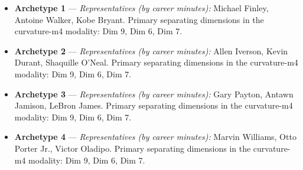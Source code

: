 \begin{itemize}
\item \textbf{Archetype 1} --- \emph{Representatives (by career minutes):} Michael Finley, Antoine Walker, Kobe Bryant. Primary separating dimensions in the curvature-m4 modality: Dim 9, Dim 6, Dim 7.
\item \textbf{Archetype 2} --- \emph{Representatives (by career minutes):} Allen Iverson, Kevin Durant, Shaquille O'Neal. Primary separating dimensions in the curvature-m4 modality: Dim 9, Dim 6, Dim 7.
\item \textbf{Archetype 3} --- \emph{Representatives (by career minutes):} Gary Payton, Antawn Jamison, LeBron James. Primary separating dimensions in the curvature-m4 modality: Dim 9, Dim 6, Dim 7.
\item \textbf{Archetype 4} --- \emph{Representatives (by career minutes):} Marvin Williams, Otto Porter Jr., Victor Oladipo. Primary separating dimensions in the curvature-m4 modality: Dim 9, Dim 6, Dim 7.
\end{itemize}
